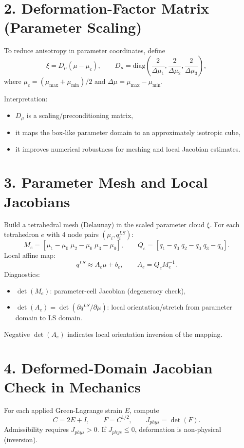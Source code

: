 \documentclass[11pt]{article}
\begin{document}
\section*{2. Deformation-Factor Matrix (Parameter Scaling)}
To reduce anisotropy in parameter coordinates, define
\begin{equation}
\xi = D_\mu(\mu-\mu_c),
\qquad
D_\mu=\mathrm{diag}\left(\frac{2}{\Delta\mu_1},\frac{2}{\Delta\mu_2},\frac{2}{\Delta\mu_3}\right),
\end{equation}
where $\mu_c=(\mu_{\max}+\mu_{\min})/2$ and $\Delta\mu=\mu_{\max}-\mu_{\min}$.

Interpretation:
\begin{itemize}
\item $D_\mu$ is a scaling/preconditioning matrix,
\item it maps the box-like parameter domain to an approximately isotropic cube,
\item it improves numerical robustness for meshing and local Jacobian estimates.
\end{itemize}

\section*{3. Parameter Mesh and Local Jacobians}
Build a tetrahedral mesh (Delaunay) in the scaled parameter cloud $\xi$.
For each tetrahedron $e$ with 4 node pairs $(\mu_i,q_i^{LS})$:
\begin{equation}
M_e = [\mu_1-\mu_0\;\mu_2-\mu_0\;\mu_3-\mu_0],
\qquad
Q_e = [q_1-q_0\;q_2-q_0\;q_3-q_0].
\end{equation}
Local affine map:
\begin{equation}
q^{LS} \approx A_e\mu+b_e,
\qquad
A_e = Q_eM_e^{-1}.
\end{equation}
Diagnostics:
\begin{itemize}
\item $\det(M_e)$: parameter-cell Jacobian (degeneracy check),
\item $\det(A_e)=\det(\partial q^{LS}/\partial\mu)$: local orientation/stretch from parameter domain to LS domain.
\end{itemize}
Negative $\det(A_e)$ indicates local orientation inversion of the mapping.

\section*{4. Deformed-Domain Jacobian Check in Mechanics}
For each applied Green-Lagrange strain $E$, compute
\begin{equation}
C = 2E + I, \qquad F = C^{1/2}, \qquad J_{phys}=\det(F).
\end{equation}
Admissibility requires $J_{phys}>0$. If $J_{phys}\le 0$, deformation is non-physical (inversion).
\end{document}

